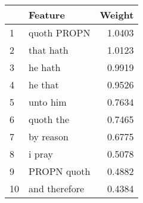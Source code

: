 \begin{tabular}{llr}
\toprule
{} &        Feature &  Weight \\
\midrule
1  &    quoth PROPN &  1.0403 \\
2  &      that hath &  1.0123 \\
3  &        he hath &  0.9919 \\
4  &        he that &  0.9526 \\
5  &       unto him &  0.7634 \\
6  &      quoth the &  0.7465 \\
7  &      by reason &  0.6775 \\
8  &         i pray &  0.5078 \\
9  &    PROPN quoth &  0.4882 \\
10 &  and therefore &  0.4384 \\
\bottomrule
\end{tabular}
